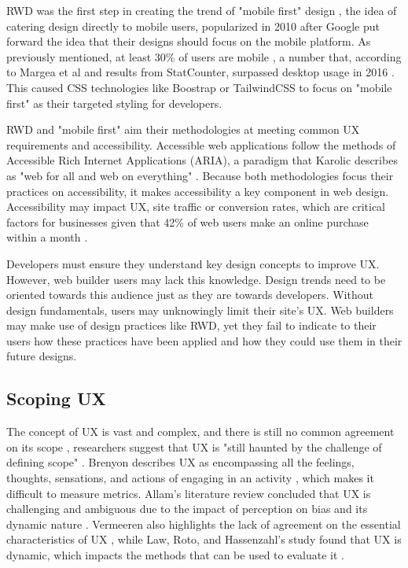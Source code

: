 \documentclass[article]{IEEEtran}
\begin{document}
            RWD was the first step in creating the trend of "mobile first" design \cite{margea}, the idea of catering design directly to mobile users, popularized in 2010 after Google put forward the idea that their designs should focus on the mobile platform. As previously mentioned, at least 30\% of users are mobile \cite{subnic}, a number that, according to Margea et al and results from StatCounter, surpassed desktop usage in 2016 \cite{margea}. This caused CSS technologies like Boostrap or TailwindCSS to focus on "mobile first" as their targeted styling for developers.
            
            RWD and "mobile first" aim their methodologies at meeting common UX requirements and accessibility. Accessible web applications follow the methods of Accessible Rich Internet Applications (ARIA), a paradigm that Karolic describes as "web for all and web on everything" \cite{karolic}. Because both methodologies focus their practices on accessibility, it makes accessibility a key component in web design. Accessibility may impact UX, site traffic or conversion rates, which are critical factors for businesses given that 42\% of web users make an online purchase within a month \cite{wan}.
                        
            Developers must ensure they understand key design concepts to improve UX. However, web builder users may lack this knowledge. Design trends need to be oriented towards this audience just as they are towards developers. Without design fundamentals, users may unknowingly limit their site's UX. Web builders may make use of design practices like RWD, yet they fail to indicate to their users how these practices have been applied and how they could use them in their future designs.
    
        \subsection{Scoping UX}
            The concept of UX is vast and complex, and there is still no common agreement on its scope \cite{law}, researchers suggest that UX is "still haunted by the challenge of defining scope" \cite{schaik}. Brenyon describes UX as encompassing all the feelings, thoughts, sensations, and actions of engaging in an activity \cite{brenyon}, which makes it difficult to measure metrics. Allam's literature review concluded that UX is challenging and ambiguous due to the impact of perception on bias and its dynamic nature \cite{allam}. Vermeeren also highlights the lack of agreement on the essential characteristics of UX \cite{vermeeren}, while Law, Roto, and Hassenzahl's study found that UX is dynamic, which impacts the methods that can be used to evaluate it \cite{law}.
            
\end{document}
